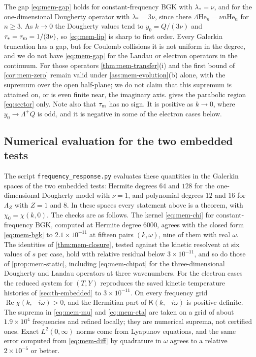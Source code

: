 \documentclass[11pt]{article}
\newcommand{\He}{\mathrm{He}}
\newcommand{\Real}{\operatorname{Re}}
\theoremstyle{definition}
\theoremstyle{remark}
\numberwithin{equation}{section}
\begin{document}
The gap \eqref{eq:mem-gap} holds for constant-frequency BGK with
$\lambda_*=\nu$, and for the one-dimensional Dougherty operator with
$\lambda_*=3\nu$, since there $\Lambda\He_n=\nu n\He_n$ for $n\geq3$. As
$k\to0$ the Dougherty values tend to $y_0=Q/(3\nu)$ and
$\tau_*=\tau_{\rm m}=1/(3\nu)$, so \eqref{eq:mem-lip} is sharp to first
order. Every Galerkin truncation has a gap, but for Coulomb collisions it
is not uniform in the degree, and we do not have \eqref{eq:mem-gap} for
the Landau or electron operators in the continuum. For those operators
\cref{thm:mem-transfer}(i) and the first bound of \cref{cor:mem-zero}
remain valid under \cref{ass:mem-evolution}(b) alone, with the supremum
over the open half-plane; we do not claim that this supremum is attained
on, or is even finite near, the imaginary axis. 
gives the parabolic region \eqref{eq:sector} only. Note also that $\tau_{\rm m}$ has no sign.
It is positive as $k\to0$, where $y_0\to\Lambda^+Q$ is odd, and it is
negative in some of the electron cases below.

\subsection{Numerical evaluation for the two embedded tests}\label{sec:mem-numerics}

The script \texttt{frequency\_response.py} evaluates these quantities in
the Galerkin spaces of the two embedded tests: Hermite degrees $64$ and
$128$ for the one-dimensional Dougherty model with $\nu=1$, and
polynomial degrees $12$ and $16$ for $\Lambda_Z$ with $Z=1$ and $8$. In
these spaces every statement above is a theorem, with
$\chi_0=\chi(k,0)$. The checks are as follows. The kernel
\eqref{eq:mem-chi} for constant-frequency BGK, computed at Hermite degree
$6000$, agrees with the closed form \eqref{eq:mem-bgk} to
$2.1\times10^{-11}$ at fifteen pairs $(k,\omega)$, nine of them with real
$\omega$. The identities of \cref{thm:mem-closure}, tested against the
kinetic resolvent at six values of $s$ per case, hold with relative
residual below $3\times10^{-11}$, and so do those of
\cref{prop:mem-static}, including \eqref{eq:mem-chipot} for the
three-dimensional Dougherty and Landau operators at three wavenumbers. For the electron cases the
reduced system for $(T,Y)$ reproduces the saved kinetic temperature
histories of \cref{sec:th-embedded} to $3\times10^{-11}$. On every
frequency grid $\Real\chi(k,-i\omega)>0$, and the Hermitian part of
$\mathsf K(k,-i\omega)$ is positive definite. The suprema in
\eqref{eq:mem-mu} and \eqref{eq:mem-eta} are taken on a grid of about
$1.9\times10^4$ frequencies and refined locally; they are numerical
suprema, not certified ones. Exact $L^2(0,\infty)$ norms come from
Lyapunov equations, and the same error computed from
\eqref{eq:mem-diff} by quadrature in $\omega$ agrees to a relative
$2\times10^{-5}$ or better.
\end{document}
